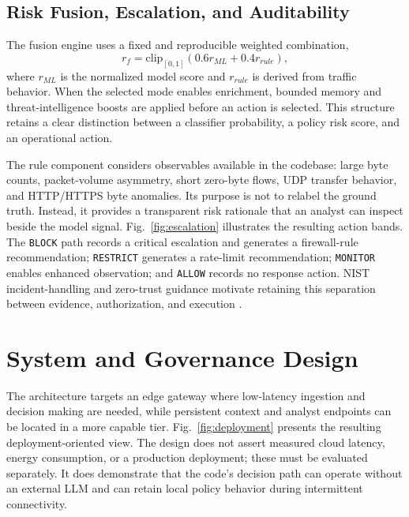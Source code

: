 \documentclass[conference]{IEEEtran}
\begin{document}
\subsection{Risk Fusion, Escalation, and Auditability}
The fusion engine uses a fixed and reproducible weighted combination,
\begin{equation}
r_f=\mathrm{clip}_{[0,1]}(0.6r_{ML}+0.4r_{rule}),
\label{eq:fusion}
\end{equation}
where $r_{ML}$ is the normalized model score and $r_{rule}$ is derived from traffic behavior. When the selected mode enables enrichment, bounded memory and threat-intelligence boosts are applied before an action is selected. This structure retains a clear distinction between a classifier probability, a policy risk score, and an operational action.

The rule component considers observables available in the codebase: large byte counts, packet-volume asymmetry, short zero-byte flows, UDP transfer behavior, and HTTP/HTTPS byte anomalies. Its purpose is not to relabel the ground truth. Instead, it provides a transparent risk rationale that an analyst can inspect beside the model signal. Fig.~\ref{fig:escalation} illustrates the resulting action bands. The \texttt{BLOCK} path records a critical escalation and generates a firewall-rule recommendation; \texttt{RESTRICT} generates a rate-limit recommendation; \texttt{MONITOR} enables enhanced observation; and \texttt{ALLOW} records no response action. NIST incident-handling and zero-trust guidance motivate retaining this separation between evidence, authorization, and execution \cite{nist61,nist207}.

\section{System and Governance Design}
The architecture targets an edge gateway where low-latency ingestion and decision making are needed, while persistent context and analyst endpoints can be located in a more capable tier. Fig.~\ref{fig:deployment} presents the resulting deployment-oriented view. The design does not assert measured cloud latency, energy consumption, or a production deployment; these must be evaluated separately. It does demonstrate that the code's decision path can operate without an external LLM and can retain local policy behavior during intermittent connectivity.
\end{document}
